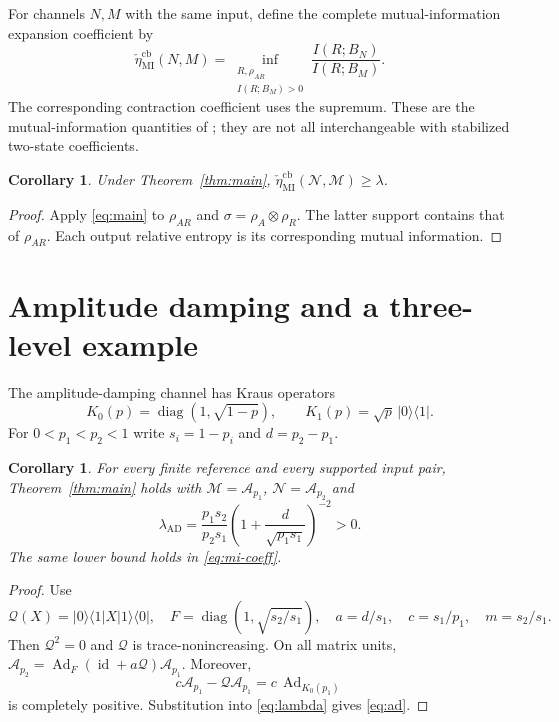 \documentclass[11pt,a4paper]{article}
\newtheorem{corollary}[theorem]{Corollary}
\theoremstyle{remark}\newtheorem{remark}[theorem]{Remark}
\newcommand{\id}{\operatorname{id}}
\newcommand{\Ad}{\operatorname{Ad}}
\newcommand{\cQ}{\mathcal Q}
\newcommand{\cM}{\mathcal M}
\newcommand{\cN}{\mathcal N}
\newcommand{\cA}{\mathcal A}
\newcommand{\ket}[1]{\lvert #1\rangle}
\newcommand{\bra}[1]{\langle #1\rvert}
\begin{document}
For channels $N,M$ with the same input, define the complete
mutual-information expansion coefficient by
\begin{equation}
 \check\eta_{\mathrm{MI}}^{\mathrm{cb}}(N,M)
 =\inf_{\substack{R,\rho_{AR}\\ I(R;B_M)>0}}
       \frac{I(R;B_N)}{I(R;B_M)} .
 \label{eq:mi-coeff}
\end{equation}
The corresponding contraction coefficient uses the supremum.
These are the mutual-information quantities of \cite[Definition~7.1]{bgsw};
they are not all interchangeable with stabilized two-state coefficients.

\begin{corollary}\label{cor:mi}
Under Theorem~\ref{thm:main},
$\check\eta_{\mathrm{MI}}^{\mathrm{cb}}(\cN,\cM)\geq\lambda$.
\end{corollary}
\begin{proof}
Apply \eqref{eq:main} to $\rho_{AR}$ and
$\sigma=\rho_A\otimes\rho_R$.
The latter support contains that of $\rho_{AR}$.
Each output relative entropy is its corresponding mutual information.
\end{proof}

\section{Amplitude damping and a three-level example}
The amplitude-damping channel has Kraus operators
\[
 K_0(p)=\operatorname{diag}(1,\sqrt{1-p}),\qquad
 K_1(p)=\sqrt p\,\ket0\bra1 .
\]
For $0<p_1<p_2<1$ write $s_i=1-p_i$ and $d=p_2-p_1$.

\begin{corollary}\label{cor:ad}
For every finite reference and every supported input pair,
Theorem~\ref{thm:main} holds with
$\cM=\cA_{p_1}$, $\cN=\cA_{p_2}$ and
\begin{equation}
 \lambda_{\mathrm{AD}}
 =\frac{p_1s_2}{p_2s_1}
   \left(1+\frac{d}{\sqrt{p_1s_1}}\right)^{-2}>0.
 \label{eq:ad}
\end{equation}
The same lower bound holds in \eqref{eq:mi-coeff}.
\end{corollary}
\begin{proof}
Use
\[
 \cQ(X)=\ket0\bra1 X\ket1\bra0,\quad
 F=\operatorname{diag}(1,\sqrt{s_2/s_1}),\quad
 a=d/s_1,\quad c=s_1/p_1,\quad m=s_2/s_1.
\]
Then $\cQ^2=0$ and $\cQ$ is trace-nonincreasing.
On all matrix units,
$\cA_{p_2}=\Ad_F(\id+a\cQ)\cA_{p_1}$.
Moreover,
\[
 c\cA_{p_1}-\cQ\cA_{p_1}
   =c\,\Ad_{K_0(p_1)}
\]
is completely positive.
Substitution into \eqref{eq:lambda} gives \eqref{eq:ad}.
\end{proof}
\end{document}

